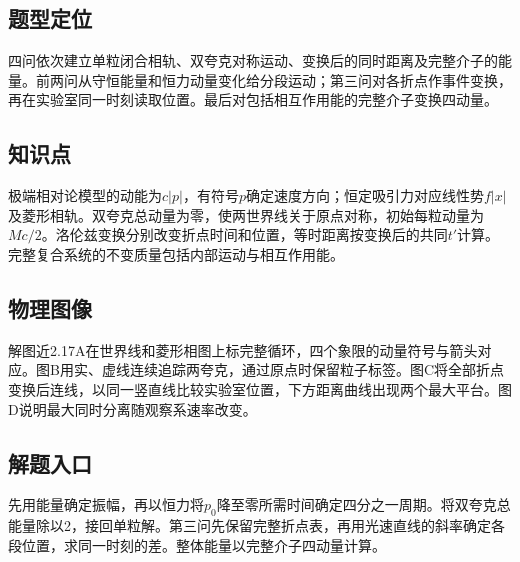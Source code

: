 \documentclass[UTF8,fontset=fandol,a4paper,11pt]{ctexart}
\begin{document}


\subsection*{题型定位}

四问依次建立单粒闭合相轨、双夸克对称运动、变换后的同时距离及完整介子的能量。前两问从守恒能量和恒力动量变化给分段运动；第三问对各折点作事件变换，再在实验室同一时刻读取位置。最后对包括相互作用能的完整介子变换四动量。



\subsection*{知识点}

极端相对论模型的动能为$c|p|$，有符号$p$确定速度方向；恒定吸引力对应线性势$f|x|$及菱形相轨。双夸克总动量为零，使两世界线关于原点对称，初始每粒动量为$Mc/2$。洛伦兹变换分别改变折点时间和位置，等时距离按变换后的共同$t'$计算。完整复合系统的不变质量包括内部运动与相互作用能。



\subsection*{物理图像}

解图近2.17A在世界线和菱形相图上标完整循环，四个象限的动量符号与箭头对应。图B用实、虚线连续追踪两夸克，通过原点时保留粒子标签。图C将全部折点变换后连线，以同一竖直线比较实验室位置，下方距离曲线出现两个最大平台。图D说明最大同时分离随观察系速率改变。



\subsection*{解题入口}

先用能量确定振幅，再以恒力将$p_0$降至零所需时间确定四分之一周期。将双夸克总能量除以2，接回单粒解。第三问先保留完整折点表，再用光速直线的斜率确定各段位置，求同一时刻的差。整体能量以完整介子四动量计算。

\end{document}
